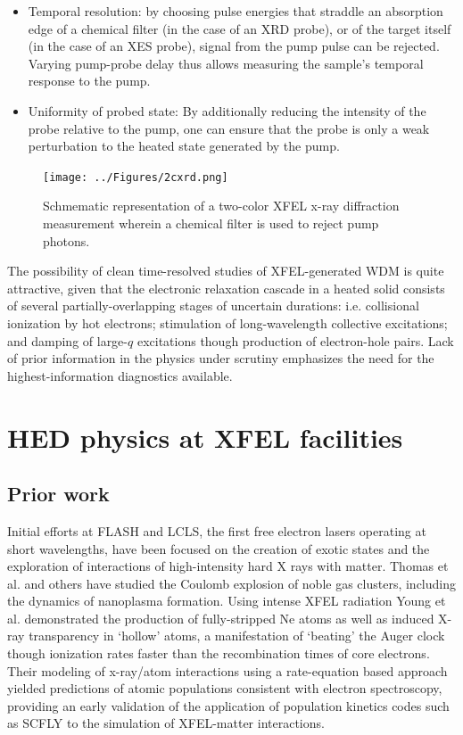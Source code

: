 \documentclass [11pt, proquest, article] {uwthesis}[2016/11/22]
\begin{document}
\begin{itemize}
\item{Temporal resolution: by choosing pulse energies that straddle an absorption edge of a chemical filter (in the case of an XRD probe), or of the target itself (in the case of an XES probe), signal from the pump pulse can be rejected. Varying pump-probe delay thus allows measuring the sample's temporal response to the pump.}
\item{Uniformity of probed state: By additionally reducing the intensity of the probe relative to the pump, one can ensure that the probe is only a weak perturbation to the heated state generated by the pump.}
\end{itemize}

\begin{figure}[h] 
\caption{Schmematic representation of a two-color XFEL x-ray diffraction measurement wherein a chemical filter is used to reject pump photons.}
\label{2cxrd}
\centering
\texttt{[image: ../Figures/2cxrd.png]}
\end{figure}


The possibility of clean time-resolved studies of XFEL-generated WDM is quite attractive, given that the electronic relaxation cascade in a heated solid consists of several partially-overlapping stages of uncertain durations: i.e. collisional ionization by hot electrons; stimulation of long-wavelength collective excitations; and damping of large-$q$ excitations though production of electron-hole pairs. Lack of prior information in the physics under scrutiny emphasizes the need for the highest-information diagnostics available.

\section{HED physics at XFEL facilities}
\subsection{Prior work}
Initial efforts at FLASH and LCLS, the first free electron lasers operating at short wavelengths, have been focused on the creation of exotic states and the exploration of interactions of high-intensity hard X rays with matter. Thomas et al. and others have studied the Coulomb explosion of noble gas clusters, including the dynamics of nanoplasma formation.\cite{thomas2009shell} Using intense XFEL radiation Young et al. demonstrated the production of fully-stripped Ne atoms as well as induced X-ray transparency in `hollow' atoms, a manifestation of `beating' the Auger clock though ionization rates faster than the recombination times of core electrons. \cite{keski1974total, young2010femtosecond} Their modeling of x-ray/atom interactions using a rate-equation based approach yielded predictions of atomic populations consistent with electron spectroscopy, providing an early validation of the application of population kinetics codes such as SCFLY to the simulation of XFEL-matter interactions. \cite{chung2017atomic}
\end{document}
